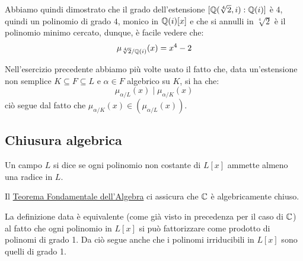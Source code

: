 \documentclass[11pt]{scrartcl}
\begin{document}
\begin{soln}
\begin{itemize}
\begin{center}
		\end{center}
Abbiamo quindi dimostrato che il grado dell'estensione $[\mathbb Q(\sqrt[4]2, i): \mathbb Q(i)]$ è $4$, quindi un polinomio di grado $4$, monico in $\mathbb Q(i)[x]$ e che si annulli in $\sqrt[4]2$ è il polinomio minimo cercato, dunque, è facile vedere che:
		\[ \mu_{\sqrt[4]2/\mathbb Q(i)}(x) = x^4 - 2
		\]
	\end{itemize}
\end{soln}

\begin{remark}
Nell'esercizio precedente abbiamo più volte usato il fatto che, data un'estensione non semplice $K \subseteq F \subseteq L$ e $\alpha \in F$ algebrico su $K$, si ha che:
	\[ \mu_{\alpha/L}(x) \mid \mu_{\alpha/K}(x)
	\]
ciò segue dal fatto che $\mu_{\alpha/K}(x) \in (\mu_{\alpha/L}(x) )$.
\end{remark}

\newpage
\subsection{Chiusura algebrica}

\begin{definition}
Un campo $L$ si dice  se ogni polinomio non costante di $L[x]$ ammette almeno una radice in $L$.
\end{definition}


\begin{remark}
Il \hyperref[p:tf]{Teorema Fondamentale dell'Algebra} ci assicura che $\mathbb C$ è algebricamente chiuso.
\end{remark}

\begin{remark}
La definizione data è equivalente (come già visto in precedenza per il caso di $\mathbb C$) al fatto che ogni polinomio in $L[x]$ si può fattorizzare come prodotto di polinomi di grado 1. Da ciò segue anche che i polinomi irriducibili in $L[x]$ sono quelli di grado 1.
\end{remark}
\end{document}
